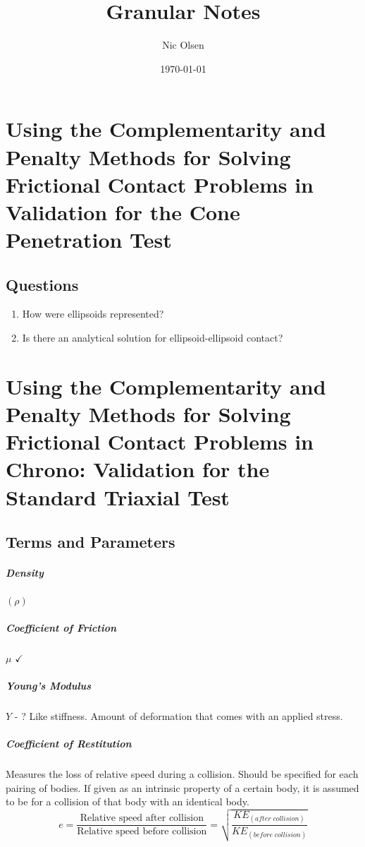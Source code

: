 \documentclass{book}
\begin{document}
\title{Granular Notes}
\author{Nic Olsen}
\date{\today}
\maketitle

\chapter[Cone Penetration]{Using the Complementarity and Penalty Methods for Solving Frictional Contact Problems in \CHRONO Validation for the Cone Penetration Test}
\section{Questions}
\begin{enumerate}
	\item How were ellipsoids represented?
	\item Is there an analytical solution for ellipsoid-ellipsoid contact?
\end{enumerate}


\chapter[Triaxial]{Using the Complementarity and Penalty Methods for Solving Frictional Contact Problems in Chrono: Validation for the Standard Triaxial Test}

\section{Terms and Parameters}
\paragraph{Density} $(\rho)$
\paragraph{Coefficient of Friction} $\mu$ $\checkmark$
\paragraph{Young's Modulus} $Y$ - ? Like stiffness. Amount of deformation that comes with an applied stress.
\paragraph{Coefficient of Restitution} Measures the loss of relative speed during a collision. Should be specified for each pairing of bodies. If given as an intrinsic property of a certain body, it is assumed to be for a collision of that body with an identical body.
\begin{equation}
e = \frac{\text{Relative speed after collision}}{\text{Relative speed before collision}} = \sqrt{\frac{KE_{(after \; collision)}}{KE_{(before \; collision)}}}
\end{equation}
\end{document}
